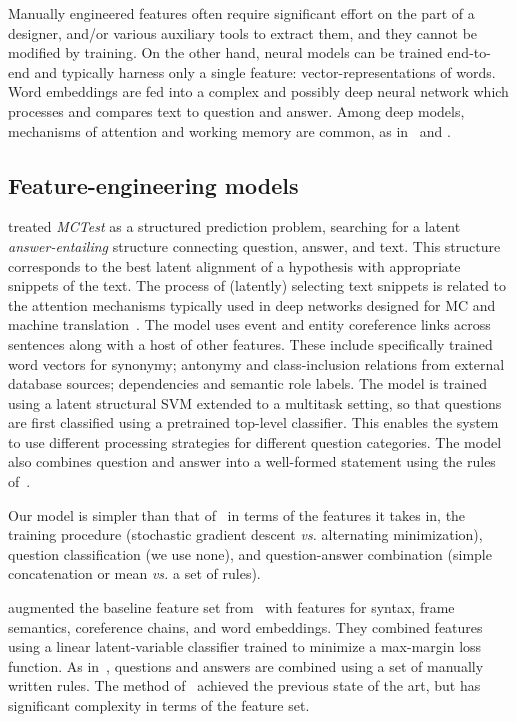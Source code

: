 \documentclass[11pt]{article}
\begin{document}
Manually engineered features often require significant effort on the part of a designer, and/or various auxiliary tools to extract them, and they cannot be modified by training. On the other hand, neural models can be trained end-to-end and typically harness only a single feature: vector-representations of words. Word embeddings are fed into a complex and possibly deep neural network which processes and compares text to question and answer. Among deep models, mechanisms of attention and working memory are common, as in~ and .

\subsection{Feature-engineering models}
 treated {\it MCTest} as a structured prediction problem, searching for a latent {\it answer-entailing} structure connecting question, answer, and text. This structure corresponds to the best latent alignment of a hypothesis with appropriate snippets of the text. The process of (latently) selecting text snippets is related to the attention mechanisms typically used in deep networks designed for MC and machine translation~\cite{bahdanau2014,weston2014,hill2015,hermann2015}. The model uses event and entity coreference links across sentences along with a host of other features. These include specifically trained word vectors for synonymy; antonymy and class-inclusion relations from external database sources; dependencies and semantic role labels. The model is trained using a latent structural SVM extended to a multitask setting, so that questions are first classified using a pretrained top-level classifier. This enables the system to use different processing strategies for different question categories. The model also combines question and answer into a well-formed statement using the rules of~.

Our model is simpler than that of~ in terms of the features it takes in, the training procedure (stochastic gradient descent {\it vs.} alternating minimization), question classification (we use none), and question-answer combination (simple concatenation or mean {\it vs.} a set of rules).

 augmented the baseline feature set from~ with features for syntax, frame semantics, coreference chains, and word embeddings. They combined features using a linear latent-variable classifier trained to minimize a max-margin loss function. As in~, questions and answers are combined using a set of manually written rules. The method of~ achieved the previous state of the art, but has significant complexity in terms of the feature set.
\end{document}
